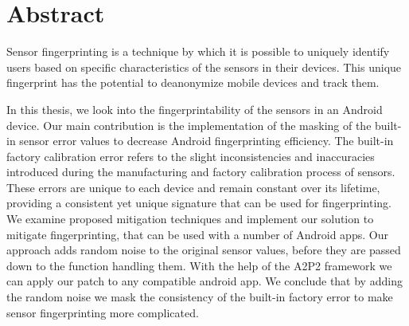 \documentclass[11pt,
  oneside,openany,    %
]{scrreprt}
\begin{document}









\printthesistitle

\chapter*{Abstract}

Sensor fingerprinting is a technique by which it is possible to uniquely identify users based on specific characteristics of the sensors in their devices. 
This unique fingerprint has the potential to deanonymize mobile devices and track them.

In this thesis, we look into the fingerprintability of the sensors in an Android device.
Our main contribution is the implementation of the masking of the built-in sensor error values to decrease Android fingerprinting efficiency.
The built-in factory calibration error refers to the slight inconsistencies and inaccuracies introduced during the manufacturing and factory calibration process of sensors. 
These errors are unique to each device and remain constant over its lifetime, providing a consistent yet unique signature that can be used for fingerprinting.
We examine proposed mitigation techniques and implement our solution to mitigate fingerprinting, that can be used with a number of Android apps.
Our approach adds random noise to the original sensor values, before they are passed down to the function handling them.
With the help of the A2P2 framework we can apply our patch to any compatible android app.
We conclude that by adding the random noise we mask the consistency of the built-in factory error to make sensor fingerprinting more complicated.
\end{document}
